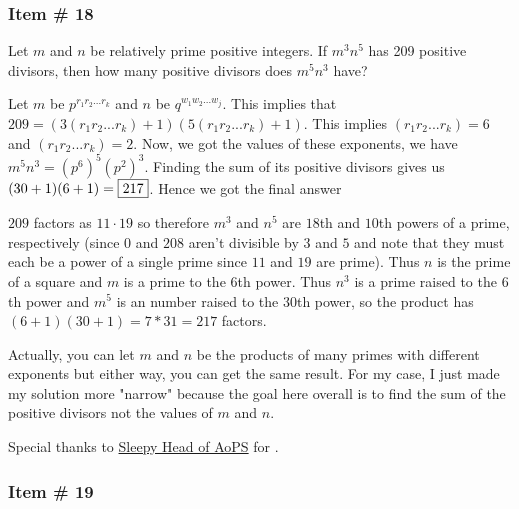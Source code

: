\documentclass[11pt,paper=letter]{scrartcl}
\begin{document}
\subsubsection{Item \# 18}

\begin{probboxed}
 Let $m$ and $n$ be relatively prime positive integers. If $m^3n^5$ has 209 positive divisors, then how many positive divisors does $m^5n^3$ have?
\end{probboxed}


Let $m$ be $p^{r_1r_2...r_k}$ and $n$ be $q^{w_1w_2...w_j}$. This implies that $209 = \left(3(r_1r_2...r_k) + 1\right)\left(5(r_1r_2...r_k) + 1\right)$. This implies $(r_1r_2...r_k) = 6$ and $(r_1r_2...r_k) =2$. Now, we got the values of these exponents, we have $m^5n^3 = (p^6)^5 (p^2)^3$. Finding the sum of its positive divisors gives us $(30+1)(6+1) = \fbox{217}$. Hence we got the final answer


$209$ factors as $11\cdot19$ so therefore $m^3$ and $n^5$ are $18$th and $10$th powers of a prime, respectively (since $0$ and $208$ aren't divisible by $3$ and $5$ and note that they must each be a power of a single prime since $11$ and $19$ are prime). Thus $n$ is the prime of a square and $m$ is a prime to the $6$th power. Thus $n^3$ is a prime raised to the $6$th power and $m^5$ is an number raised to the $30$th power, so the product has $(6+1)(30+1)=7*31=217$ factors.

\begin{mdframed}
\begin{rem}
Actually, you can let $m$ and $n$ be the products of many primes with different exponents but either way, you can get the same result. For my case, I just made my solution more "narrow" because the goal here overall is to find the sum of the positive divisors not the values of $m$ and $n$.
\end{rem}

\begin{rem}
Special thanks to \href{https://artofproblemsolving.com/community/user/470584}{Sleepy Head of AoPS} for .
\end{rem}
\end{mdframed}

\subsubsection{Item \# 19}
\end{document}

